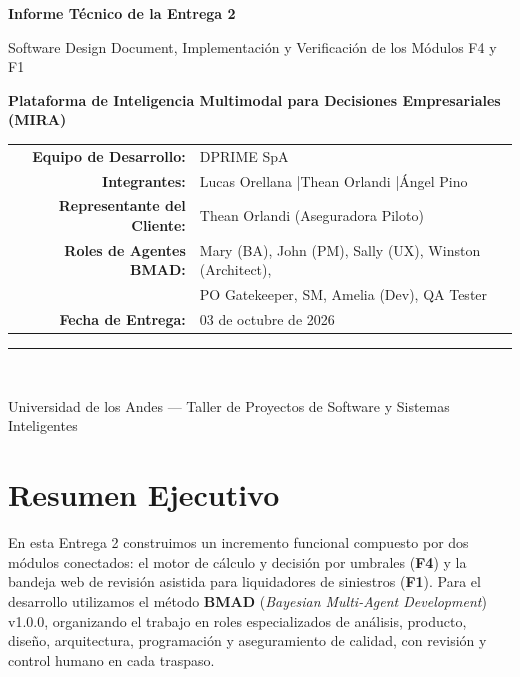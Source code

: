 \documentclass[11pt,letterpaper]{article}
\begin{document}
\begin{titlepage}
    \centering
    \vspace*{0.5cm}
    {\LARGE\bfseries Informe Técnico de la Entrega 2\par}
    \vspace{0.3cm}
    {\large Software Design Document, Implementación y Verificación de los Módulos F4 y F1\par}
    \vspace{0.6cm}
    {\Large\bfseries Plataforma de Inteligencia Multimodal para Decisiones Empresariales (MIRA)\par}
    \vspace{1.0cm}

    \begin{tabularx}{0.88\textwidth}{rY}
        \textbf{Equipo de Desarrollo:} & DPRIME SpA\\
        \textbf{Integrantes:} & Lucas Orellana \quad|\quad Thean Orlandi \quad|\quad Ángel Pino\\
        \textbf{Representante del Cliente:} & Thean Orlandi (Aseguradora Piloto)\\
        \textbf{Roles de Agentes BMAD:} & Mary (BA), John (PM), Sally (UX), Winston (Architect),\\
        & PO Gatekeeper, SM, Amelia (Dev), QA Tester\\
        \textbf{Fecha de Entrega:} & 03 de octubre de 2026
    \end{tabularx}

    \vfill
    \noindent\rule{0.88\textwidth}{0.8pt}\\[0.4em]
    {\small Universidad de los Andes — Taller de Proyectos de Software y Sistemas Inteligentes\par}
\end{titlepage}

\newpage

\section{Resumen Ejecutivo}

En esta Entrega 2 construimos un incremento funcional compuesto por dos módulos conectados: el motor de cálculo y decisión por umbrales (\textbf{F4}) y la bandeja web de revisión asistida para liquidadores de siniestros (\textbf{F1}). Para el desarrollo utilizamos el método \textbf{BMAD} (\textit{Bayesian Multi-Agent Development}) v1.0.0, organizando el trabajo en roles especializados de análisis, producto, diseño, arquitectura, programación y aseguramiento de calidad, con revisión y control humano en cada traspaso.
\end{document}
